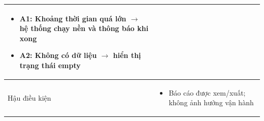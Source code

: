 \begin{longtable}{|>{\raggedright\arraybackslash}p{}|>{\raggedright\arraybackslash}p{}|}
\begin{itemize}[leftmargin=*]
\item A1: Khoảng thời gian quá lớn $\rightarrow$ hệ thống chạy nền và thông báo khi xong
\item A2: Không có dữ liệu $\rightarrow$ hiển thị trạng thái empty
\end{itemize}
\vspace{-0.5em}
\\
\hline
Hậu điều kiện &
\vspace{-0.5em}
\begin{itemize}[leftmargin=*]
\item Báo cáo được xem/xuất; không ảnh hưởng vận hành
\end{itemize}
\vspace{-0.5em}
\\
\hline
\end{longtable}

